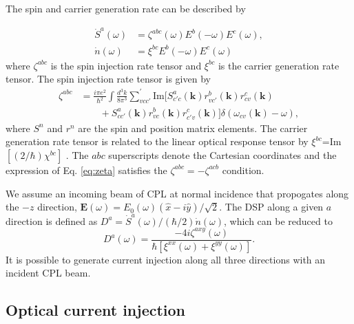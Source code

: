 \documentclass[pss]{wiley2sp} %
\begin{document}
The spin and carrier generation rate can be described by 

\begin{align*}
\dot{S}^{a}(\omega) &= \zeta^{abc}(\omega)E^{b}(-\omega)E^{c}(\omega), \nonumber \\ 
\dot{n}(\omega)     &= \xi^{bc}E^{b}(-\omega)E^{c}(\omega)
\end{align*}
where $\zeta^{abc}$ is the spin injection rate tensor and $\xi^{bc}$ is the carrier generation rate tensor. The spin injection rate tensor is given by
\begin{align}\label{eq:zeta}
\zeta^{abc} &= \frac{i\pi e^{2}}{\hbar^{2}}\int\frac{d^{3}k}{8\pi^{3}}
\sum_{vcc'}^{\prime}\text{Im}\bigl[S^{a}_{c'c}(\textbf{k})
r^{b}_{vc'}(\textbf{k})r^{c}_{cv}(\textbf{k})\nonumber\\
&\qquad+S^{a}_{cc'}(\textbf{k})
r^{b}_{vc}(\textbf{k})r^{c}_{c'v}(\textbf{k})\bigr]
\delta(\omega_{cv}(\textbf{k})-\omega),
\end{align}
where $S^{n}$ and $r^{n}$ are the spin and position matrix elements. The carrier generation rate tensor is related to the linear optical response tensor by $\xi^{bc}$=Im$[(2/\hbar)\chi^{bc}]$ . The $abc$ superscripts denote the Cartesian coordinates and the expression of Eq. \eqref{eq:zeta} satisfies the $\zeta^{abc} = -\zeta^{acb}$ condition.

We assume an incoming beam of CPL at normal incidence that propogates along the $-z$ direction, $\mathbf{E}(\omega) = E_{0}(\omega)(\hat{x} - i\hat{y})/\sqrt{2}$. The DSP along a given $a$ direction is defined as $D^{a}=\dot{S}^{a}(\omega)/(\hbar/2)\dot{n}(\omega)$, which can be reduced to 
\begin{equation}\label{eq:D^i}
D^{a}(\omega) = 
\frac{-4i\zeta^{axy}(\omega)}
    {\hbar\left[\xi^{xx}(\omega) + \xi^{yy}(\omega)\right]}.
\end{equation}
It is possible to generate current injection along all three directions with
an incident CPL beam.


\subsection{Optical current injection}\label{sec:theory-OCI}
\end{document}
